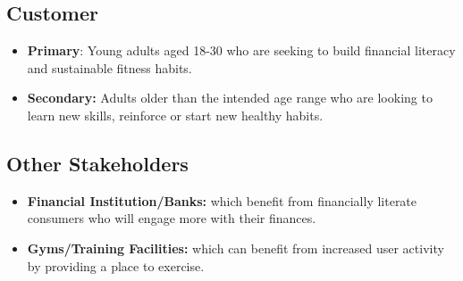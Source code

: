 \documentclass[12pt]{article}
\begin{document}
\subsection{Customer}
\begin{itemize}
    \item \textbf{Primary}: Young adults aged 18-30 who are seeking to build financial literacy and sustainable fitness habits. 
    \item \textbf{Secondary:} Adults older than the intended age range who are looking to learn new skills, reinforce or start new healthy habits.
\end{itemize}
\subsection{Other Stakeholders}
\begin{itemize}
    \item \textbf{Financial Institution/Banks:} which benefit from financially literate consumers who will engage more with their finances.
    \item \textbf{Gyms/Training Facilities:} which can benefit from increased user activity by providing a place to exercise. 
\end{itemize}
\end{document}
